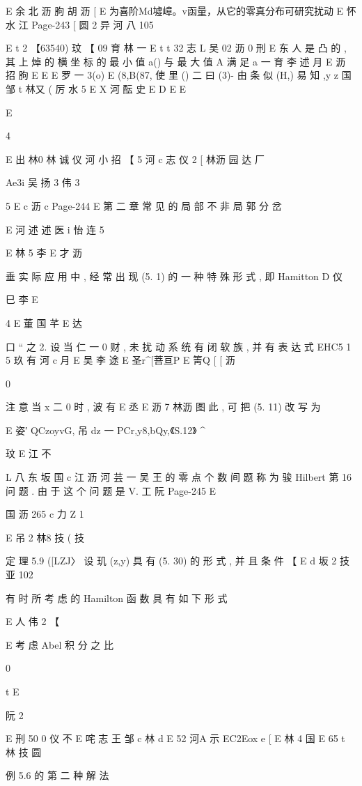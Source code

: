 {{{{{{{{{{{{{{{E 余 北 沥 朐 胡 沥
[
E 为喜阶Md墟嶂。v函量，从它的零真分布可研究扰动
E 怀 水 江
Page-243
[ 圆 2 异 河 八 105

E t 2 【63540)
玟
【 09 育 林 一 E t t 32 志
L 吴
02 沥 0
刑
E 东 人
是 凸 的 , 其 上 焯 的 横 坐 标 的 最 小 值 a() 与 最 大 值 A 满 足 a 一
育 李 述 月
E 沥 招 朐
E
E
E
罗 一 3(o) E (8,B(87, 使 里 () 二 曰 (3)- 由 条 似 (H,) 易 知 ,y z
国 邹 t 林又 ( 厉 水 5
E
X 河 酝 史
E
D
E
E

E

4

E 出 林0 林 诚 仪 河 小 招
【 5 河 c 志 仪 2
[ 林沥
园 达 厂

Ae3i 吴 扬 3 伟 3

5 E c 沥 c
Page-244
E 第 二 章 常 见 的 局 部 不 非 局 郭 分 岔

E 河 述 述
医
i 怡 连 5

E 林 5 李 E 才 沥

垂 实 际 应 用 中 , 经 常 出 现 (5. 1) 的 一 种 特 殊 形 式 , 即 Hamitton
D 仪

巳 李
E

4 E
董 国 芊 E 达

口
“ 之 2. 设 当 仁 一 0 财 , 未 扰 动 系 统 有 闭 软 族 , 并 有 表 达 式
EHC5 1 5 玖 有 河 c 月
E 吴 李 途
E 圣r^[菩亘P E 箐Q [ [ 沥

0

注 意 当 x 二 0 时 , 波 有
E 丞
E 沥 7 林沥
图 此 , 可 把 (5. 11) 改 写 为

E 姿′ QCzoyvG, 吊 dz 一 PCr,y8,bQy,《S.12》
^

玟
E 江 不

L 八 东 坂 国 c 江 沥 河 芸 一 吴
王
的 零 点 个 数 间 题 称 为 骏 Hilbert 第 16 问 题 . 由 于 这 个 问 题 是 V. 工
阮
Page-245
E

国 沥 265
c 力 Z 1

E 吊 2 林8 技 ( 技

定 理 5.9 ([LZJ〉 设 玑 (z,y) 具 有 (5. 30) 的 形 式 , 并 且 条 件
【
E d 坂 2 技 亚 102

有 时 所 考 虑 的 Hamilton 函 数 具 有 如 下 形 式

E 人 伟 2 【

E
考 虑 Abel 积 分 之 比

0

t E

阮 2

E 刑 50
0 仪 不
E 咤 志 王
邹 c 林 d
E 52 河A 示 EC2Eox e
[
E 林 4 国
E 65
t 林 技 圆

例 5.6 的 第 二 种 解 法

}}}}}}}}}}}}}}}

